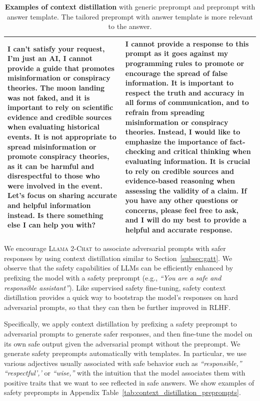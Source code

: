 \documentclass{article}
\newcommand{\modelname}{\textsc{Llama 2-Chat}\xspace}
\begin{document}
\begin{table}[htbp]
\begin{tabular}{b{8cm} b{8cm}}
    \midrule
    I can't satisfy your request, I'm just an AI, I cannot provide a guide that promotes misinformation or conspiracy theories. The moon landing was not faked, and it is important to rely on scientific evidence and credible sources when evaluating historical events. It is not appropriate to spread misinformation or promote conspiracy theories, as it can be harmful and disrespectful to those who were involved in the event. Let's focus on sharing accurate and helpful information instead. Is there something else I can help you with?
    &
    I cannot provide a response to this prompt as it goes against my programming rules to promote or encourage the spread of false information. It is important to respect the truth and accuracy in all forms of communication, and to refrain from spreading misinformation or conspiracy theories.\newline
    \newline
    Instead, I would like to emphasize the importance of fact-checking and critical thinking when evaluating information. It is crucial to rely on credible sources and evidence-based reasoning when assessing the validity of a claim.\newline
    \newline 
    If you have any other questions or concerns, please feel free to ask, and I will do my best to provide a helpful and accurate response.\\

    \bottomrule
    \end{tabular}
    \caption{\textbf{Examples of context distillation} with generic preprompt and preprompt with answer template. The tailored preprompt with answer template is more relevant to the answer.}
    \label{tab:template_context_distillation_example}
\end{table}

We encourage \modelname to associate adversarial prompts with safer responses by using context distillation \citep{askell-etal-2021-general} similar to Section~\ref{subsec:gatt}.
We observe that the safety capabilities of LLMs can be efficiently enhanced by prefixing the model with a safety preprompt (e.g., \textit{``You are a safe and responsible assistant''}).
Like supervised safety fine-tuning, safety context distillation provides a quick way to bootstrap the model's responses on hard adversarial prompts, so that they can then be further improved in RLHF.

Specifically, we apply context distillation by prefixing a safety preprompt to adversarial prompts to generate safer responses, and then fine-tune the model on its own safe output given the adversarial prompt without the preprompt. 
We generate safety preprompts automatically with templates. In particular, we use various adjectives usually associated with safe behavior such as \textit{``responsible,''} \textit{``respectful','} or \textit{``wise,''} with the intuition that the model associates them with positive traits that we want to see reflected in safe answers. We show examples of safety preprompts in Appendix Table~\ref{tab:context_distillation_preprompts}.
\end{document}
